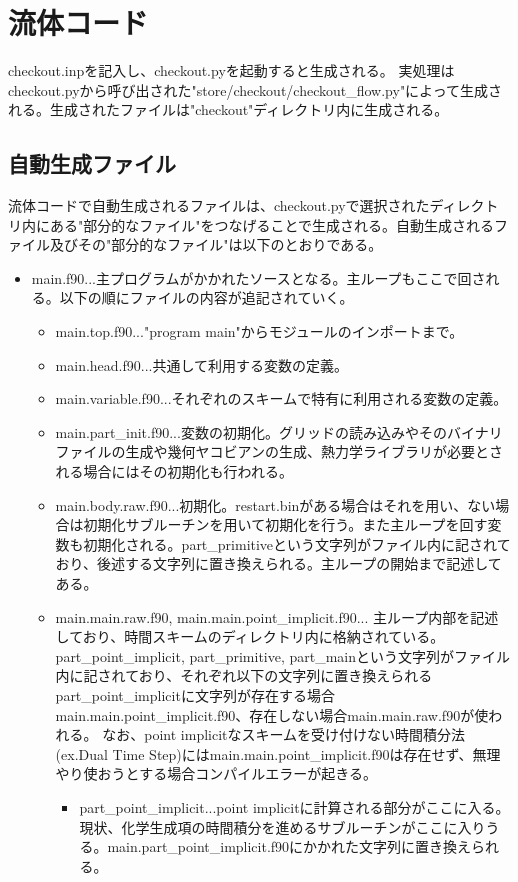 \documentclass{jsarticle}
\begin{document}
\section{流体コード}\label{流体コード}%
checkout.inpを記入し、checkout.pyを起動すると生成される。
実処理はcheckout.pyから呼び出された"store/checkout/checkout\_flow.py"によって生成される。生成されたファイルは"checkout"ディレクトリ内に生成される。
\subsection{自動生成ファイル}%
流体コードで自動生成されるファイルは、checkout.pyで選択されたディレクトリ内にある"部分的なファイル"をつなげることで生成される。自動生成されるファイル及びその"部分的なファイル"は以下のとおりである。
\begin{itemize}
\item main.f90...主プログラムがかかれたソースとなる。主ループもここで回される。以下の順にファイルの内容が追記されていく。
\begin{itemize}
\item main.top.f90..."program main"からモジュールのインポートまで。
\item main.head.f90...共通して利用する変数の定義。
\item main.variable.f90...それぞれのスキームで特有に利用される変数の定義。
\item main.part\_init.f90...変数の初期化。グリッドの読み込みやそのバイナリファイルの生成や幾何ヤコビアンの生成、熱力学ライブラリが必要とされる場合にはその初期化も行われる。
\item main.body.raw.f90...初期化。restart.binがある場合はそれを用い、ない場合は初期化サブルーチンを用いて初期化を行う。また主ループを回す変数も初期化される。part\_primitiveという文字列がファイル内に記されており、後述する文字列に置き換えられる。主ループの開始まで記述してある。
\item main.main.raw.f90, main.main.point\_implicit.f90...
主ループ内部を記述しており、時間スキームのディレクトリ内に格納されている。
part\_point\_implicit, part\_primitive, part\_mainという文字列がファイル内に記されており、それぞれ以下の文字列に置き換えられる
part\_point\_implicitに文字列が存在する場合main.main.point\_implicit.f90、存在しない場合main.main.raw.f90が使われる。
なお、point implicitなスキームを受け付けない時間積分法(ex.Dual Time Step)にはmain.main.point\_implicit.f90は存在せず、無理やり使おうとする場合コンパイルエラーが起きる。
\begin{itemize}
\item part\_point\_implicit...point implicitに計算される部分がここに入る。現状、化学生成項の時間積分を進めるサブルーチンがここに入りうる。main.part\_point\_implicit.f90にかかれた文字列に置き換えられる。

\end{itemize}
\end{itemize}
\end{itemize}
\end{document}
